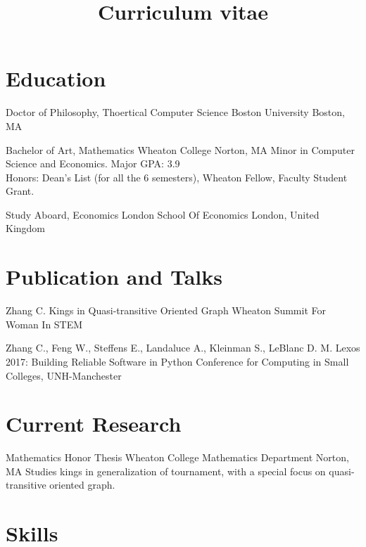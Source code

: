 \documentclass[11pt,a4paper,roman]{moderncv}        %
\title{Curriculum vitae}
\begin{document}

\makecvtitle{}

\setlength{\parskip}{2.5px}


\section{Education}

{Doctor of Philosophy, Thoertical Computer Science}
{Boston University}
{Boston, MA} {}
{}  %

{Bachelor of Art, Mathematics}
{Wheaton College}
{Norton, MA} {}
{Minor in Computer Science and Economics. Major GPA\@: 3.9\\
Honors: Dean's List (for all the 6 semesters), Wheaton Fellow, Faculty Student Grant.}

{Study Aboard, Economics}
{London School Of Economics}
{London, United Kingdom}{}
{}  %



\section{Publication and Talks}

{Zhang C.}
{Kings in Quasi-transitive Oriented Graph}
{Wheaton Summit For Woman In STEM}
{}{}

{Zhang C., Feng W., Steffens E., Landaluce A., Kleinman S., LeBlanc D. M.}
{Lexos 2017: Building Reliable Software in Python}
{Conference for Computing in Small Colleges, UNH-Manchester}
{}{}



\section{Current Research}
{Mathematics Honor Thesis}
{Wheaton College Mathematics Department}
{Norton, MA}{}
{Studies kings in generalization of tournament,
with a special focus on quasi-transitive oriented graph.}



\section{Skills}
\end{document}
